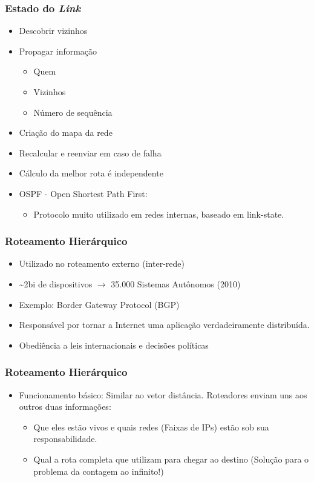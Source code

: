 \documentclass{beamer}
\begin{document}
\begin{frame}
\frametitle{Estado do \emph{Link}}

\begin{itemize}
  \item Descobrir vizinhos
  \item Propagar informação
  \begin{itemize}
     \item Quem
     \item Vizinhos
     \item Número de sequência
  \end{itemize}
  \item Criação do mapa da rede
  \item Recalcular e reenviar em caso de falha
  \item Cálculo da melhor rota é independente
  \item OSPF - Open Shortest Path First:
  \begin{itemize}
     \item Protocolo muito utilizado em redes internas,
        baseado em link-state.
  \end{itemize}
\end{itemize}
\end{frame}

\begin{frame}
\frametitle{Roteamento Hierárquico}
\begin{itemize}
  \setlength{\itemsep}{0.7cm}%
  \item Utilizado no roteamento externo (inter-rede)
  \item \textasciitilde2bi de dispositivos $\to$ 35.000 Sistemas Autônomos
  (2010)
  \item Exemplo: Border Gateway Protocol (BGP)
  \item Responsável por tornar a Internet uma aplicação verdadeiramente distribuída.
  \item Obediência a leis internacionais e decisões políticas
\end{itemize}
\end{frame}

\begin{frame}
\frametitle{Roteamento Hierárquico}
\begin{itemize}
  \item Funcionamento básico: Similar ao vetor distância. Roteadores enviam uns
  aos outros duas informações:
  \begin{itemize}
    \item Que eles estão vivos e quais redes (Faixas de IPs) estão sob sua
    responsabilidade.
    \item Qual a rota completa que utilizam para chegar ao destino (Solução para
    o problema da contagem ao infinito!)
  \end{itemize}
\end{itemize}
\end{frame}
\end{document}
